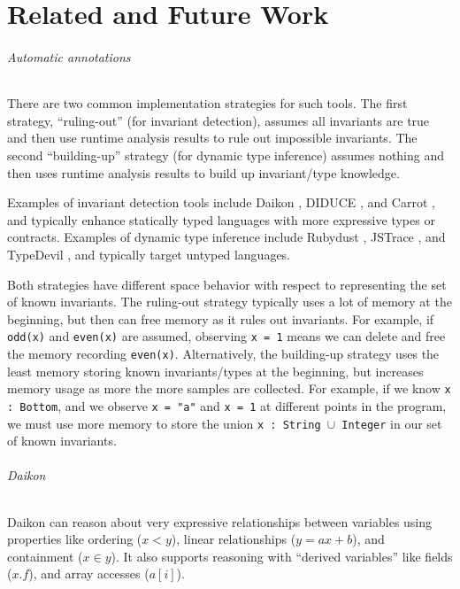 \documentclass[11pt]{iuthesis}
\begin{document}




\part*{Related and Future Work}



%

\paragraph{Automatic annotations}
There are two common implementation strategies for such tools. The first
strategy, ``ruling-out'' (for invariant detection), assumes all invariants are true 
and then use runtime analysis results to rule out
impossible invariants. The second ``building-up'' strategy (for dynamic type inference)
assumes nothing and then uses runtime analysis results to build up invariant/type knowledge.

Examples of invariant detection tools include Daikon \cite{Ernst06thedaikon},
DIDUCE \cite{hangal2002tracking}, and Carrot \cite{pytlik2003automated}, and
typically enhance statically typed languages with more expressive types or contracts.
Examples of dynamic type inference include Rubydust \cite{An10dynamicinference},
JSTrace \cite{saftoiu2010jstrace}, and TypeDevil \cite{pradel2015typedevil},
and typically target untyped languages.

Both strategies have different space behavior with respect to representing
the set of known invariants.
The ruling-out strategy typically uses a lot of memory at the beginning,
but then can free memory as it rules out invariants. For example, if
\texttt{odd(x)} and \texttt{even(x)} are assumed, observing \texttt{x = 1}
means we can delete and free the memory recording \texttt{even(x)}.
Alternatively, the building-up strategy uses the least memory storing
known invariants/types at the beginning, but increases memory usage
as more the more samples are collected. For example, if we know
\texttt{x : Bottom}, and we observe \texttt{x = "a"} and \texttt{x = 1}
at different points in the program, we must use more memory to
store the union \texttt{x : String $\cup$ Integer} in our set of known invariants.

\paragraph{Daikon}
Daikon can reason about very expressive relationships between variables
using properties like ordering ($x < y$), linear relationships ($y = ax + b$),
and containment ($x \in y$). It also supports reasoning with ``derived variables''
like fields ($x.f$), and array accesses ($a[i]$).
\end{document}
